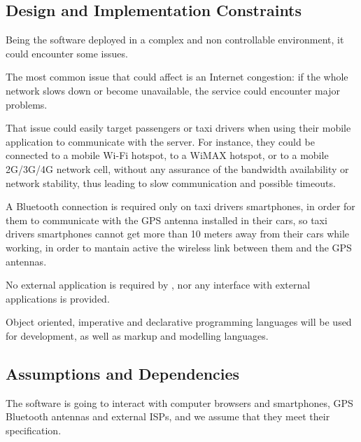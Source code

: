 \subsection{Design and Implementation Constraints}
Being the software deployed in a complex and non controllable environment, it could encounter some issues.\par
The most common issue that could affect \myTaxiService{} is an Internet congestion: if the whole network slows down or become unavailable, the service could encounter major problems.\par
That issue could easily target passengers or taxi drivers when using their mobile application to communicate with the server.
For instance, they could be connected to a mobile Wi-Fi hotspot, to a WiMAX hotspot, or to a mobile 2G/3G/4G network cell, without any assurance of the bandwidth availability or network stability, thus leading to slow communication and possible timeouts.\par
A Bluetooth connection is required only on taxi drivers smartphones, in order for them to communicate with the GPS antenna installed in their cars, so taxi drivers smartphones cannot get more than 10 meters away from their cars while working, in order to mantain active the wireless link between them and the GPS antennas.\par
No external application is required by \myTaxiService{}, nor any interface with external applications is provided.\par
Object oriented, imperative and declarative programming languages will be used for \myTaxiService{} development, as well as markup and modelling languages.\par
\subsection{Assumptions and Dependencies}
The software is going to interact with computer browsers and smartphones, GPS Bluetooth antennas and external ISPs, and we assume that they meet their specification.
